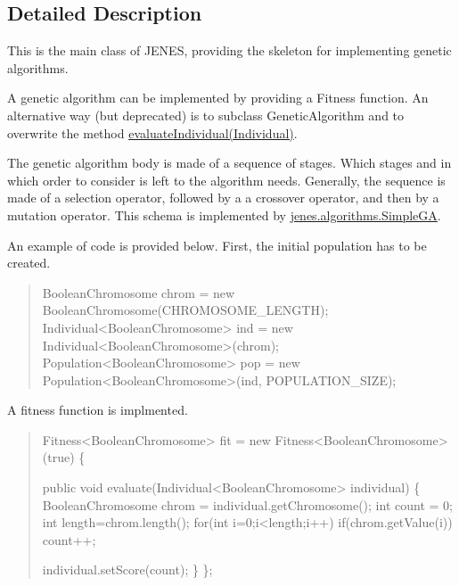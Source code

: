 \subsection{Detailed Description}
This is the main class of J\-E\-N\-E\-S, providing the skeleton for implementing genetic algorithms. 

A genetic algorithm can be implemented by providing a {\ttfamily Fitness} function. An alternative way (but deprecated) is to subclass {\ttfamily Genetic\-Algorithm} and to overwrite the method \hyperlink{}{evaluate\-Individual(\-Individual)}. 

The genetic algorithm body is made of a sequence of stages. Which stages and in which order to consider is left to the algorithm needs. Generally, the sequence is made of a selection operator, followed by a a crossover operator, and then by a mutation operator. This schema is implemented by \hyperlink{}{jenes.\-algorithms.\-Simple\-G\-A}. 

An example of code is provided below. First, the initial population has to be created. 

\begin{quotation}



\begin{DoxyPre}
BooleanChromosome chrom = new BooleanChromosome(CHROMOSOME\_LENGTH);
Individual<BooleanChromosome> ind = new Individual<BooleanChromosome>(chrom);
Population<BooleanChromosome> pop = new Population<BooleanChromosome>(ind,
        POPULATION\_SIZE);
\end{DoxyPre}


\end{quotation}


A fitness function is implmented.

\begin{quotation}

\begin{DoxyPre}
Fitness<BooleanChromosome> fit = new Fitness<BooleanChromosome>(true) \{\end{DoxyPre}



\begin{DoxyPre}    
    public void evaluate(Individual<BooleanChromosome> individual) \{
        BooleanChromosome chrom = individual.getChromosome();
        int count = 0;
        int length=chrom.length();
        for(int i=0;i<length;i++)
            if(chrom.getValue(i))
                count++;\end{DoxyPre}



\begin{DoxyPre}            individual.setScore(count);
         \}           
    \};
\end{DoxyPre}
 \end{quotation}


